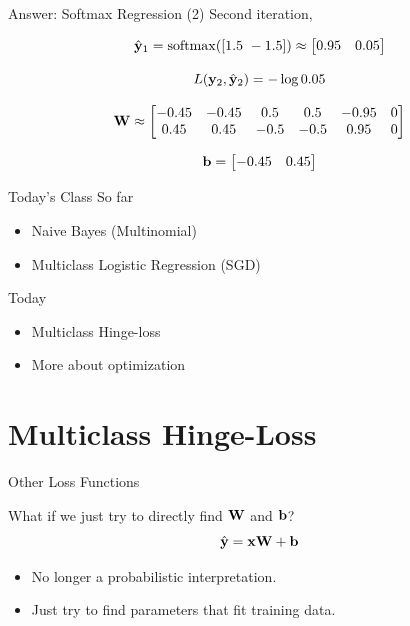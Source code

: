 \documentclass{beamer}
\begin{document}
\begin{frame}{Answer: Softmax Regression (2) }
  Second iteration,

  \[\hat{\boldy}_1 = \softmax([1.5\ -1.5] ) \approx \begin{bmatrix} 0.95 &  0.05  \end{bmatrix}\]

  \[ L(\mathbf{y}_2, \hat{\mathbf{y}}_2) = - \log 0.05 \]

  \[ \mathbf{W} \approx
  \begin{bmatrix}
    -0.45 & -0.45 & 0.5 & 0.5 & -0.95 & 0 \\
     0.45 & 0.45 & -0.5 & -0.5 & 0.95 & 0 \\
  \end{bmatrix}
  \]

  \[ \mathbf{b} =
  \begin{bmatrix}
    -0.45 & 0.45 \\
  \end{bmatrix} \]
\end{frame}


\begin{frame}{Today's Class}
  So far
  \begin{itemize}
  \item Naive Bayes (Multinomial)
  \item Multiclass Logistic Regression (SGD)
  \end{itemize}

  Today

  \begin{itemize}
  \item Multiclass Hinge-loss
  \item More about optimization
  \end{itemize}
\end{frame}


\section{Multiclass Hinge-Loss}

\begin{frame}{Other Loss Functions}
  
  What if we just try to directly find $\mathbf{W}$ and $\mathbf{b}$? 
     \[\hat{\mathbf{y}} = \mathbf{x} \mathbf{W} + \mathbf{b}\]   
     
     \begin{itemize}
     \item No longer a probabilistic interpretation.
     \item Just try to find parameters that fit training data.
     \end{itemize}

\end{frame}
\end{document}
